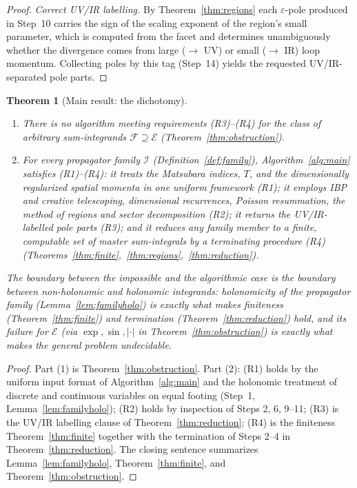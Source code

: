 \documentclass{amsart}
\newtheorem{theorem}{Theorem}
\theoremstyle{definition}
\begin{document}
\begin{proof}
\emph{Correct UV/IR labelling.} By Theorem~\ref{thm:regions} each
$\varepsilon$-pole produced in Step~10 carries the sign of the scaling exponent
of the region's small parameter, which is computed from the facet and
determines unambiguously whether the divergence comes from large
($\to$ UV) or small ($\to$ IR) loop momentum. Collecting poles by this tag
(Step~14) yields the requested UV/IR-separated pole parts.
\end{proof}

\begin{theorem}[Main result: the dichotomy]\label{thm:main}
\hfill
\begin{enumerate}
\item There is no algorithm meeting requirements \textnormal{(R3)--(R4)} for the
class of arbitrary sum-integrands $\mathcal F\supseteq\mathcal E$
\textnormal{(Theorem~\ref{thm:obstruction})}.
\item For every propagator family $\mathcal I$
\textnormal{(Definition~\ref{def:family})}, Algorithm~\ref{alg:main} satisfies
\textnormal{(R1)--(R4)}: it treats the Matsubara indices, $T$, and the
dimensionally regularized spatial momenta in one uniform framework
\textnormal{(R1)}; it employs IBP \emph{and} creative telescoping, dimensional
recurrences, Poisson resummation, the method of regions and sector
decomposition \textnormal{(R2)}; it returns the UV/IR-labelled pole parts
\textnormal{(R3)}; and it reduces any family member to a finite, computable set
of master sum-integrals by a terminating procedure \textnormal{(R4)}
\textnormal{(Theorems~\ref{thm:finite},~\ref{thm:regions},~\ref{thm:reduction})}.
\end{enumerate}
The boundary between the impossible and the algorithmic case is the boundary
between non-holonomic and holonomic integrands: holonomicity of the propagator
family \textnormal{(Lemma~\ref{lem:familyholo})} is exactly what makes
finiteness \textnormal{(Theorem~\ref{thm:finite})} and termination
\textnormal{(Theorem~\ref{thm:reduction})} hold, and its failure for
$\mathcal E$ \textnormal{(via $\exp,\sin,|\cdot|$ in
Theorem~\ref{thm:obstruction})} is exactly what makes the general problem
undecidable.
\end{theorem}

\begin{proof}
Part (1) is Theorem~\ref{thm:obstruction}. Part (2): (R1) holds by the uniform
input format of Algorithm~\ref{alg:main} and the holonomic treatment of
discrete and continuous variables on equal footing (Step~1,
Lemma~\ref{lem:familyholo}); (R2) holds by inspection of Steps 2, 6, 9--11;
(R3) is the UV/IR labelling clause of Theorem~\ref{thm:reduction}; (R4) is the
finiteness Theorem~\ref{thm:finite} together with the termination of Steps 2--4
in Theorem~\ref{thm:reduction}. The closing sentence summarizes
Lemma~\ref{lem:familyholo}, Theorem~\ref{thm:finite}, and
Theorem~\ref{thm:obstruction}.
\end{proof}
\end{document}
